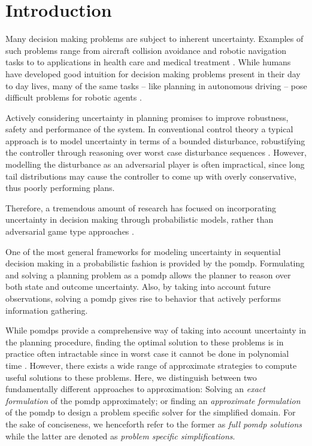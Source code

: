\chapter{Introduction}\label{chap:introduction}


Many decision making problems are subject to inherent uncertainty. Examples of
such problems range from aircraft collision avoidance and robotic navigation
tasks to to applications in health care and medical treatment
\cite{kochenderfer2012next, bandyopadhyay2013intention, pineau2003towards,
schaefer2005modeling}. While humans have developed good intuition for decision
making problems present in their day to day lives, many of the same tasks --
like planning in autonomous driving -- pose difficult problems for robotic
agents \cite{levinson2011towards}.

Actively considering uncertainty in planning promises to improve robustness,
safety and performance of the system. In conventional control theory a typical
approach is to model uncertainty in terms of a bounded disturbance,
robustifying the controller through reasoning over worst case disturbance
sequences \cite{petersen2012robust}. However, modelling the disturbance as an
adversarial player is often impractical, since long tail distributions may
cause the controller to come up with overly conservative, thus poorly
performing plans.

Therefore, a tremendous amount of research has focused on incorporating
uncertainty in decision making through probabilistic models, rather than
adversarial game type approaches \cite{roy1999coastal, amato2015planning,
fisac2018probabilistically, choudhury2019dynamic}.

One of the most general frameworks for modeling uncertainty in sequential
decision making in a probabilistic fashion is provided by the \ac{pomdp}.
Formulating and solving a planning problem as a \ac{pomdp} allows the planner
to reason over both state and outcome uncertainty. Also, by taking into account
future observations, solving a \ac{pomdp} gives rise to behavior that actively
performs information gathering.

While \acp{pomdp} provide a comprehensive way of taking into account
uncertainty in the planning procedure, finding the optimal solution to these
problems is in practice often intractable since in worst case it cannot be done
in polynomial time \cite{papadimitriou1987complexity}. However, there exists
a wide range of approximate strategies to compute useful solutions to these
problems. Here, we distinguish between two fundamentally different approaches
to approximation: Solving an \emph{exact formulation} of the \ac{pomdp}
approximately; or finding an \emph{approximate formulation} of the \ac{pomdp}
to design a problem specific solver for the simplified domain. For the sake of
conciseness, we henceforth refer to the former as \emph{full \ac{pomdp}
solutions} while the latter are denoted as \emph{problem specific
simplifications}.

